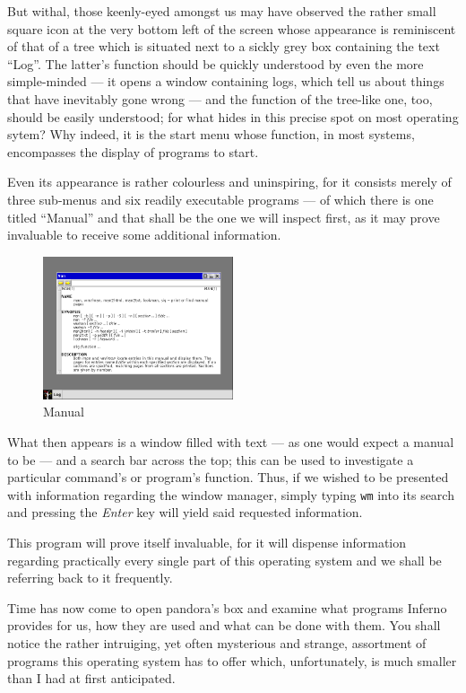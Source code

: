 \documentclass[a5paper,twoside,12pt]{report}
\begin{document}
  But withal, those keenly-eyed amongst us may have observed the rather small square icon at the very bottom left of the screen whose appearance is reminiscent of that of a tree which is situated next to a sickly grey box containing the text ``Log''. The latter's function should be quickly understood by even the more simple-minded — it opens a window containing logs, which tell us about things that have inevitably gone wrong — and the function of the tree-like one, too, should be easily understood; for what hides in this precise spot on most operating sytem? Why indeed, it is the start menu whose function, in most systems, encompasses the display of programs to start.

  Even its appearance is rather colourless and uninspiring, for it consists merely of three sub-menus and six readily executable programs — of which there is one titled ``Manual'' and that shall be the one we will inspect first, as it may prove invaluable to receive some additional information.

  \begin{figure}
    \centering
    \includegraphics[width=0.5\textwidth]{imgs/manual.png}
    \caption{Manual}
  \end{figure}

  What then appears is a window filled with text — as one would expect a manual to be — and a search bar across the top; this can be used to investigate a particular command's or program's function. Thus, if we wished to be presented with information regarding the window manager, simply typing \texttt{wm} into its search and pressing the \textit{Enter} key will yield said requested information.

  This program will prove itself invaluable, for it will dispense information regarding practically every single part of this operating system and we shall be referring back to it frequently.

  Time has now come to open pandora's box and examine what programs Inferno provides for us, how they are used and what can be done with them. You shall notice the rather intruiging, yet often mysterious and strange, assortment of programs this operating system has to offer which, unfortunately, is much smaller than I had at first anticipated.\newpage
\end{document}
